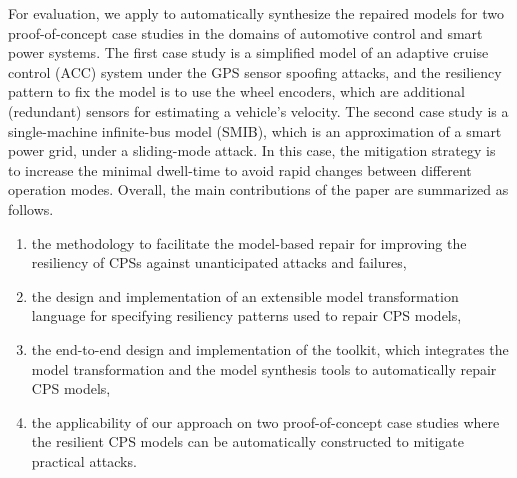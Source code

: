 For evaluation, we apply \toolreaffirm to automatically synthesize the repaired models for two proof-of-concept case studies in the domains of automotive control and smart power systems. The first case study is a simplified model of an adaptive cruise control (ACC) system under the GPS sensor spoofing attacks, and the resiliency pattern to fix the model is to use the wheel encoders, which are additional (redundant) sensors for estimating a vehicle's velocity. The second case study is a single-machine infinite-bus model (SMIB), which is an approximation of a smart power grid, under a sliding-mode attack. In this case, the mitigation strategy is to increase the minimal dwell-time to avoid rapid changes between different operation modes. 
%
%
%
Overall, the main contributions of the paper are summarized as follows.
%
\begin{enumerate}[leftmargin= 2 em]
\item the methodology to facilitate the model-based repair for improving the resiliency of CPSs against unanticipated attacks and failures,
\item the design and implementation of an extensible model transformation language for specifying resiliency patterns used to repair CPS models,
\item the end-to-end design and implementation of the toolkit, which integrates the model transformation and the model synthesis tools to automatically repair CPS models,
\item the applicability of our approach on two proof-of-concept case studies where the resilient CPS models can be automatically constructed to mitigate practical attacks.
\end{enumerate}
%
%
%

